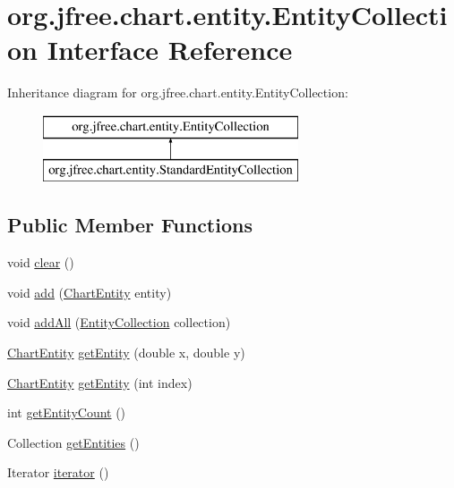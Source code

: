 \hypertarget{interfaceorg_1_1jfree_1_1chart_1_1entity_1_1_entity_collection}{}\section{org.\+jfree.\+chart.\+entity.\+Entity\+Collection Interface Reference}
\label{interfaceorg_1_1jfree_1_1chart_1_1entity_1_1_entity_collection}
Inheritance diagram for org.\+jfree.\+chart.\+entity.\+Entity\+Collection\+:\begin{figure}[H]
\begin{center}
\leavevmode
\includegraphics[height=2.000000cm]{interfaceorg_1_1jfree_1_1chart_1_1entity_1_1_entity_collection}
\end{center}
\end{figure}
\subsection*{Public Member Functions}
\begin{DoxyCompactItemize}
\item 
void \mbox{\hyperlink{interfaceorg_1_1jfree_1_1chart_1_1entity_1_1_entity_collection_a425608737568917935db291594224dd5}{clear}} ()
\item 
void \mbox{\hyperlink{interfaceorg_1_1jfree_1_1chart_1_1entity_1_1_entity_collection_adf370a130e27fabdb6785a82982f245b}{add}} (\mbox{\hyperlink{classorg_1_1jfree_1_1chart_1_1entity_1_1_chart_entity}{Chart\+Entity}} entity)
\item 
void \mbox{\hyperlink{interfaceorg_1_1jfree_1_1chart_1_1entity_1_1_entity_collection_a8085e4a67b6483c092a73b4298fd2193}{add\+All}} (\mbox{\hyperlink{interfaceorg_1_1jfree_1_1chart_1_1entity_1_1_entity_collection}{Entity\+Collection}} collection)
\item 
\mbox{\hyperlink{classorg_1_1jfree_1_1chart_1_1entity_1_1_chart_entity}{Chart\+Entity}} \mbox{\hyperlink{interfaceorg_1_1jfree_1_1chart_1_1entity_1_1_entity_collection_a3bd10315f4cc926b0565e1fff221a1ec}{get\+Entity}} (double x, double y)
\item 
\mbox{\hyperlink{classorg_1_1jfree_1_1chart_1_1entity_1_1_chart_entity}{Chart\+Entity}} \mbox{\hyperlink{interfaceorg_1_1jfree_1_1chart_1_1entity_1_1_entity_collection_a9b449323f9e3a9b8aeb4f369b908ce10}{get\+Entity}} (int index)
\item 
int \mbox{\hyperlink{interfaceorg_1_1jfree_1_1chart_1_1entity_1_1_entity_collection_a7137111d39cd14123986f57e4e1d209c}{get\+Entity\+Count}} ()
\item 
Collection \mbox{\hyperlink{interfaceorg_1_1jfree_1_1chart_1_1entity_1_1_entity_collection_a6c5ae749a998551433c0e172bf11cfb6}{get\+Entities}} ()
\item 
Iterator \mbox{\hyperlink{interfaceorg_1_1jfree_1_1chart_1_1entity_1_1_entity_collection_a69ebb556987750e02a98f978e26fa4e7}{iterator}} ()
\end{DoxyCompactItemize}


